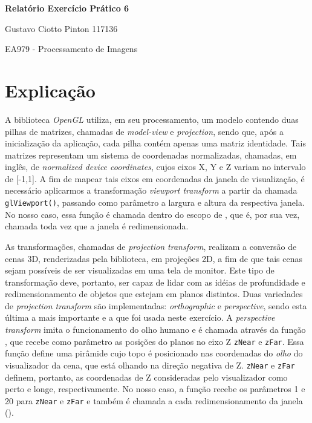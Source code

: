 \documentclass[12pt, a4paper]{article}
\begin{document}
    {\large
    \centerline{\textbf{Relatório Exercício Prático 6}}
    \centerline{Gustavo Ciotto Pinton 117136}
    \centerline{EA979 - Processamento de Imagens}
    }

\section {Explicação}

A biblioteca \textit{OpenGL} utiliza, em seu processamento, um modelo contendo
duas pilhas de matrizes, chamadas de \textit{model-view} e \textit{projection},
sendo que, após a inicialização da aplicação, cada pilha contém apenas uma
matriz identidade. Tais matrizes representam um sistema de coordenadas
normalizadas, chamadas, em inglês, de \textit{normalized device coordinates},
cujos eixos X, Y e Z variam no intervalo de [-1,1]. A fim de mapear tais
eixos em coordenadas da janela de visualização, é necessário aplicarmos a
transformação \textit{viewport transform} a partir da chamada
\texttt{glViewport()}, passando como parâmetro a largura e altura da respectiva
janela. No nosso caso, essa função é chamada dentro do escopo de
, que é, por sua vez, chamada toda vez que a janela é
redimensionada.  

\vspace{12pt}

As transformações, chamadas de \textit{projection transform}, realizam a
conversão de cenas 3D, renderizadas pela biblioteca, em projeções 2D, a fim de
que tais cenas sejam possíveis de ser visualizadas em uma tela de monitor. Este
tipo de transformação deve, portanto, ser capaz de lidar com as idéias de
profundidade e redimensionamento de objetos que estejam em planos distintos.
Duas variedades de \textit{projection transform} são implementadas:
\textit{orthographic} e \textit{perspective}, sendo esta última a mais
importante e a que foi usada neste exercício. A \textit{perspective transform}
imita o funcionamento do olho humano e é chamada através da função
, que recebe como parâmetro as posições do planos no eixo Z
\texttt{zNear} e \texttt{zFar}. Essa função define uma pirâmide cujo topo é
posicionado nas coordenadas do \textit{olho} do visualizador da cena, que está
olhando na direção negativa de Z. \texttt{zNear} e \texttt{zFar} definem,
portanto, as coordenadas de Z consideradas pelo visualizador como perto e longe,
respectivamente. No nosso caso, a função  recebe os
parâmetros 1 e 20 para \texttt{zNear} e \texttt{zFar} e também é chamada a cada
redimensionamento da janela ().
\end{document}
